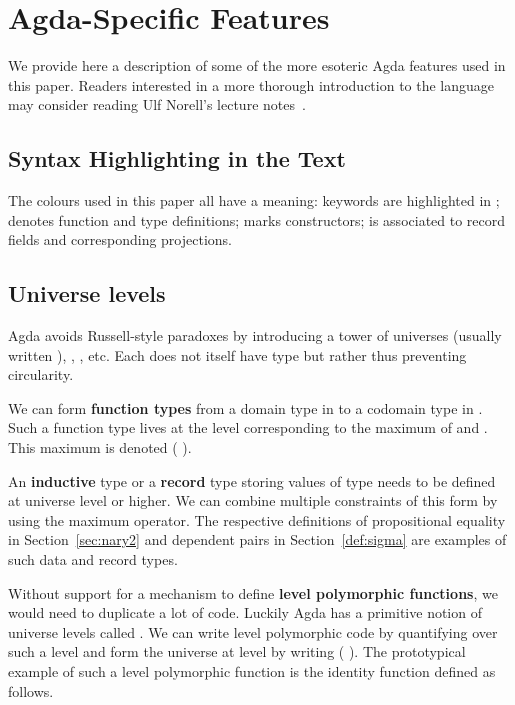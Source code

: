 \section{Agda-Specific Features}\label{appendix:agda}

We provide here a description of some of the more esoteric Agda
features used in this paper. Readers interested in a more thorough
introduction to the language may consider reading Ulf Norell's lecture
notes~\cite{DBLP:conf/afp/Norell08}.

\subsection{Syntax Highlighting in the Text}

The colours used in this paper all have a meaning: keywords are highlighted
in ;  denotes function and type definitions; 
marks constructors;  is associated to record fields and
corresponding projections.

\subsection{Universe levels}\label{appendix:agda:level}
\balance

Agda avoids Russell-style paradoxes by introducing a tower of universes
 (usually written ), , , etc. Each
 does not itself have type  but rather  thus
preventing circularity.

We can form {\bf function types} from a domain type in  to a codomain
type in . Such a function type lives at the level corresponding
to the maximum of  and . This maximum is denoted {(  )}.

An {\bf inductive} type or a {\bf record} type storing values of type 
needs to be defined at universe level  or higher. We can combine multiple
constraints of this form by using the maximum operator. The respective definitions
of propositional equality in Section~\ref{sec:nary2} and dependent pairs in
Section~\ref{def:sigma} are examples of such data and record types.

Without support for a mechanism to define {\bf level polymorphic functions},
we would need to duplicate a lot of code. Luckily Agda has a primitive notion
of universe levels called . We can write level polymorphic code by
quantifying over such a level  and form the universe at level
 by writing ( ). The prototypical example of such a level
polymorphic function is the identity function  defined as follows.


